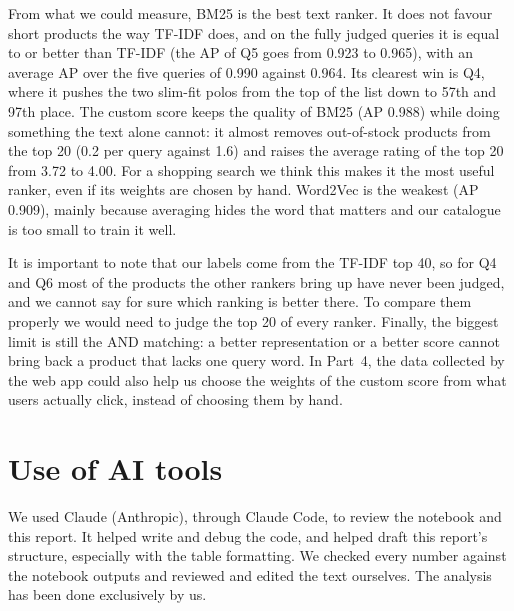 \documentclass[11pt,a4paper]{article}
\begin{document}
From what we could measure, BM25 is the best text ranker. It does not favour short products the way TF-IDF does, and on the fully judged queries it is equal to or better than TF-IDF (the AP of Q5 goes from 0.923 to 0.965), with an average AP over the five queries of 0.990 against 0.964. Its clearest win is Q4, where it pushes the two slim-fit polos from the top of the list down to 57th and 97th place. The custom score keeps the quality of BM25 (AP 0.988) while doing something the text alone cannot: it almost removes out-of-stock products from the top 20 (0.2 per query against 1.6) and raises the average rating of the top 20 from 3.72 to 4.00. For a shopping search we think this makes it the most useful ranker, even if its weights are chosen by hand. Word2Vec is the weakest (AP 0.909), mainly because averaging hides the word that matters and our catalogue is too small to train it well.

It is important to note that our labels come from the TF-IDF top 40, so for Q4 and Q6 most of the products the other rankers bring up have never been judged, and we cannot say for sure which ranking is better there. To compare them properly we would need to judge the top 20 of every ranker. Finally, the biggest limit is still the AND matching: a better representation or a better score cannot bring back a product that lacks one query word. In Part~4, the data collected by the web app could also help us choose the weights of the custom score from what users actually click, instead of choosing them by hand.

\section*{Use of AI tools}

We used Claude (Anthropic), through Claude Code, to review the notebook and this report. It
helped write and debug the code, and helped draft this report's structure, especially with
the table formatting. We checked every number against the notebook outputs and reviewed and edited the
text ourselves. The analysis has been done exclusively by us.
\end{document}

